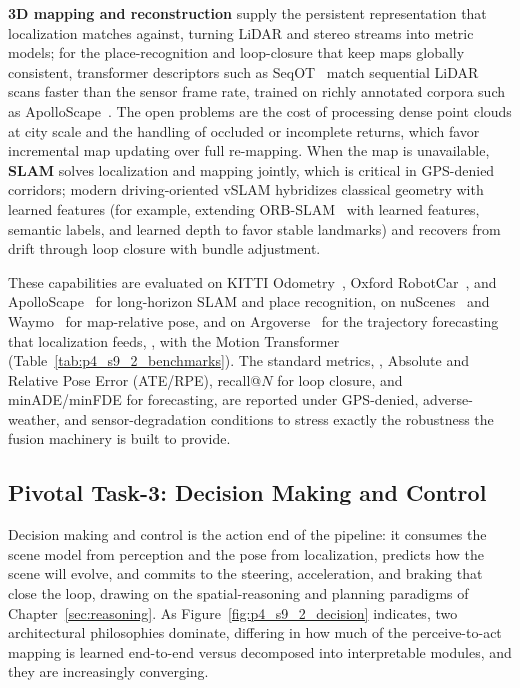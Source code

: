 \textbf{3D mapping and reconstruction} supply the persistent representation that localization matches against, turning LiDAR and stereo streams into metric models; for the place-recognition and loop-closure that keep maps globally consistent, transformer descriptors such as SeqOT~\cite{ma2022seqot} match sequential LiDAR scans faster than the sensor frame rate, trained on richly annotated corpora such as ApolloScape~\cite{wang2019apolloscape}. The open problems are the cost of processing dense point clouds at city scale and the handling of occluded or incomplete returns, which favor incremental map updating over full re-mapping. When the map is unavailable, \textbf{SLAM} solves localization and mapping jointly, which is critical in GPS-denied corridors; modern driving-oriented vSLAM hybridizes classical geometry with learned features (for example, extending ORB-SLAM~\cite{mur2017orb} with learned features, semantic labels, and learned depth to favor stable landmarks) and recovers from drift through loop closure with bundle adjustment.

These capabilities are evaluated on KITTI Odometry~\cite{KITTI-GeigerLU12}, Oxford RobotCar~\cite{Maddern2017RobotCar}, and ApolloScape~\cite{wang2019apolloscape} for long-horizon SLAM and place recognition, on nuScenes~\cite{caesar2020nuscenes} and Waymo~\cite{WaymoOpen-SunKDCPTGZCCVHN20} for map-relative pose, and on Argoverse~\cite{Argoverse-ChangLSSBHW0LRH19} for the trajectory forecasting that localization feeds, \eg, with the Motion Transformer~\cite{shi2022mtr} (Table~\ref{tab:p4_s9_2_benchmarks}). The standard metrics, \ie, Absolute and Relative Pose Error (ATE/RPE), recall@$N$ for loop closure, and minADE/minFDE for forecasting, are reported under GPS-denied, adverse-weather, and sensor-degradation conditions to stress exactly the robustness the fusion machinery is built to provide.

\subsection{Pivotal Task-3: Decision Making and Control}
\label{subsec:p4-sec9-2-pivotal-task-3-decision-making-and-control}
Decision making and control is the action end of the pipeline: it consumes the scene model from perception and the pose from localization, predicts how the scene will evolve, and commits to the steering, acceleration, and braking that close the loop, drawing on the spatial-reasoning and planning paradigms of Chapter~\ref{sec:reasoning}. As Figure~\ref{fig:p4_s9_2_decision} indicates, two architectural philosophies dominate, differing in how much of the perceive-to-act mapping is learned end-to-end versus decomposed into interpretable modules, and they are increasingly converging.

